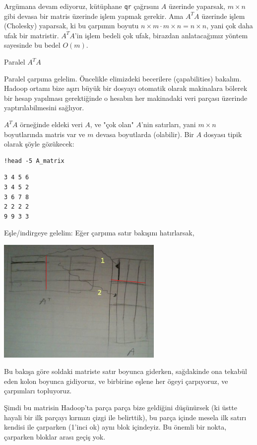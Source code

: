 \documentclass[12pt,fleqn]{article}\usepackage{../../common}
\begin{document}
Argümana devam ediyoruz, kütüphane \verb!qr! çağrısını $A$ üzerinde yaparsak, $m
\times n$ gibi devasa bir matris üzerinde işlem yapmak gerekir. Ama $A^TA$
üzerinde işlem (Cholesky) yaparsak, ki bu çarpımın boyutu $n \times m \cdot m
\times n = n \times n$, yani çok daha ufak bir matristir. $A^TA$'in işlem bedeli
çok ufak, birazdan anlatacağımız yöntem sayesinde bu bedel $O(m)$.

Paralel $A^TA$

Paralel çarpıma gelelim. Öncelikle elimizdeki becerilere (çapabilities)
bakalım. Hadoop ortamı bize aşırı büyük bir dosyayı otomatik olarak makinalara
bölerek bir hesap yapılması gerektiğinde o hesabın her makinadaki veri parçası
üzerinde yaptırılabilmesini sağlıyor.

$A^TA$ örneğinde eldeki veri $A$, ve "çok olan" $A$'nin satırları, yani $m
\times n$ boyutlarında matris var ve $m$ devasa boyutlarda (olabilir). Bir $A$
dosyası tipik olarak şöyle gözükecek:

\begin{verbatim}
!head -5 A_matrix
\end{verbatim}

\begin{verbatim}
3 4 5 6
3 4 5 2
3 6 7 8
2 2 2 2
9 9 3 3
\end{verbatim}

Eşle/indirgeye gelelim: Eğer çarpıma satır bakışını hatırlarsak,

\includegraphics[height=6cm]{AtA.png}

Bu bakışa göre soldaki matriste satır boyunca giderken, sağdakinde ona tekabül
eden kolon boyunca gidiyoruz, ve birbirine eşlene her ögeyi çarpıyoruz, ve
çarpımları topluyoruz.

Şimdi bu matrisin Hadoop'ta parça parça bize geldiğini düşünürsek (ki üstte
hayali bir ilk parçayı kırmızı çizgi ile belirttik), bu parça içinde mesela ilk
satırı kendisi ile çarparken (1'inci ok) aynı blok içindeyiz. Bu önemli bir
nokta, çarparken bloklar arası geçiş yok.
\end{document}
